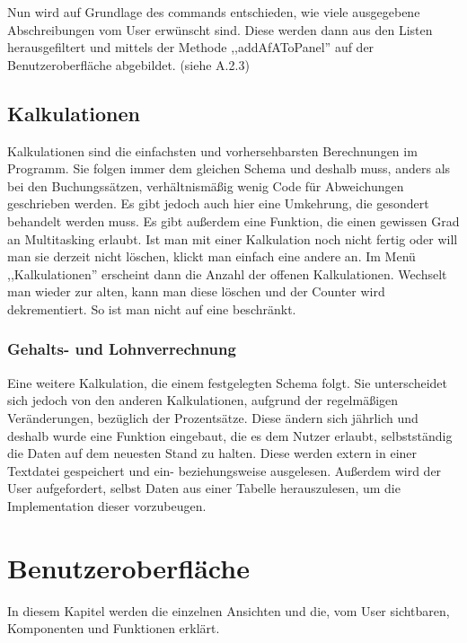 \documentclass[12pt]{report}
\begin{document}
\noindent Nun wird auf Grundlage des commands entschieden, wie viele ausgegebene Abschreibungen vom User erwünscht sind. Diese werden dann aus den Listen herausgefiltert und mittels der Methode ,,addAfAToPanel'' auf der Benutzeroberfläche abgebildet. (siehe A.2.3)
  
\section{Kalkulationen}
Kalkulationen sind die einfachsten und vorhersehbarsten Berechnungen im Programm. Sie folgen immer dem gleichen Schema und deshalb muss, anders als bei den Buchungssätzen, verhältnismäßig wenig Code für Abweichungen geschrieben werden. Es gibt jedoch auch hier eine Umkehrung, die gesondert behandelt werden muss. Es gibt außerdem eine Funktion, die einen gewissen Grad an Multitasking erlaubt. Ist man mit einer Kalkulation noch nicht fertig oder will man sie derzeit nicht löschen, klickt man einfach eine andere an. Im Menü ,,Kalkulationen'' erscheint dann die Anzahl der offenen Kalkulationen. Wechselt man wieder zur alten, kann man diese löschen und der Counter wird dekrementiert. So ist man nicht auf eine beschränkt.
\subsection{Gehalts- und Lohnverrechnung}
Eine weitere Kalkulation, die einem festgelegten Schema folgt. Sie unterscheidet sich jedoch von den anderen Kalkulationen, aufgrund der regelmäßigen Veränderungen, bezüglich der Prozentsätze. Diese ändern sich jährlich und deshalb wurde eine Funktion eingebaut, die es dem Nutzer erlaubt, selbstständig die Daten auf dem neuesten Stand zu halten. Diese werden extern in einer Textdatei gespeichert und ein- beziehungsweise ausgelesen. Außerdem wird der User aufgefordert, selbst Daten aus einer Tabelle herauszulesen, um die Implementation dieser vorzubeugen.





\chapter{Benutzeroberfläche}
 
In diesem Kapitel werden die einzelnen Ansichten und die, vom User sichtbaren, Komponenten und Funktionen erklärt.
 
\end{document}
